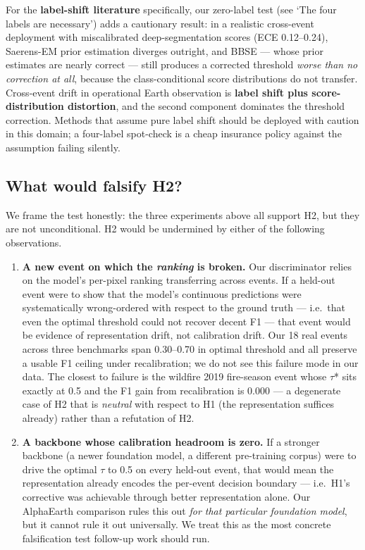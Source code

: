 \documentclass[sn-nature,lineno]{sn-jnl}
\theoremstyle{thmstyleone}
\theoremstyle{thmstyletwo}
\theoremstyle{thmstylethree}
\begin{document}
For the \textbf{label-shift literature} specifically, our zero-label test
(see `The four labels are necessary') adds a cautionary result: in a realistic cross-event
deployment with miscalibrated deep-segmentation scores (ECE
0.12--0.24), Saerens-EM prior estimation diverges outright, and BBSE ---
whose prior estimates are nearly correct --- still produces a corrected
threshold \emph{worse than no correction at all}, because the
class-conditional score distributions do not transfer. Cross-event
drift in operational Earth observation is \textbf{label shift plus score-
distribution distortion}, and the second component dominates the
threshold correction. Methods that assume pure label shift should be
deployed with caution in this domain; a four-label spot-check is a
cheap insurance policy against the assumption failing silently.

\subsection{What would falsify H2?}\label{what-would-falsify-h2}

We frame the test honestly: the three experiments above all support H2,
but they are not unconditional. H2 would be undermined by either of
the following observations.

\begin{enumerate}
\def\labelenumi{(\roman{enumi})}
\item
  \textbf{A new event on which the \emph{ranking} is broken.} Our discriminator
  relies on the model's per-pixel ranking transferring across events.
  If a held-out event were to show that the model's continuous predictions
  were systematically wrong-ordered with respect to the ground truth ---
  i.e.~that even the optimal threshold could not recover decent F1 --- that
  event would be evidence of representation drift, not calibration drift.
  Our 18 real events across three benchmarks span 0.30--0.70 in optimal
  threshold and all preserve a usable F1 ceiling under recalibration; we
  do not see this failure mode in our data. The closest to failure is
  the wildfire 2019 fire-season event whose $\tau$* sits exactly at 0.5 and
  the F1 gain from recalibration is 0.000 --- a degenerate case of H2 that
  is \emph{neutral} with respect to H1 (the representation suffices already)
  rather than a refutation of H2.
\item
  \textbf{A backbone whose calibration headroom is zero.} If a stronger
  backbone (a newer foundation model, a different pre-training corpus)
  were to drive the optimal $\tau$ to 0.5 on every held-out event, that would
  mean the representation already encodes the per-event decision
  boundary --- i.e.~H1's corrective was achievable through better
  representation alone. Our AlphaEarth comparison rules this out \emph{for
  that particular foundation model}, but it cannot rule it out
  universally. We treat this as the most concrete falsification test
  follow-up work should run.
\end{enumerate}
\end{document}
